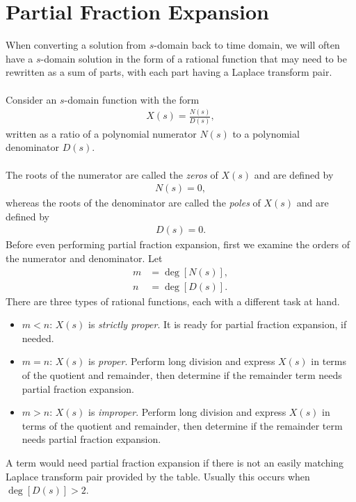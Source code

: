 \documentclass{report}
\begin{document}
\section{Partial Fraction Expansion}
When converting a solution from $s$-domain back to time domain, we will often have a $s$-domain solution in the form of a rational function that may need to be rewritten as a sum of parts, with 
each part having a Laplace transform pair.
\\ \\
Consider an $s$-domain function with the form
\begin{align}
    X(s) = \frac{N(s)}{D(s)},
\end{align}
written as a ratio of a polynomial numerator $N(s)$ to a polynomial denominator $D(s)$. 
\\ \\
The roots of the numerator are called the \emph{zeros} of $X(s)$ and are defined by 
\begin{align}
    N(s) = 0,
\end{align}
whereas the roots of the denominator are called the \emph{poles} of $X(s)$ and are defined by 
\begin{align}
    D(s) = 0.
\end{align}
Before even performing partial fraction expansion, first we examine the orders of the numerator and denominator. Let 
\begin{align}
    m &= \deg[N(s)], \\ 
    n &= \deg[D(s)].
\end{align}
There are three types of rational functions, each with a different task at hand.
\begin{itemize}
    \item $m < n$: $X(s)$ is \emph{strictly proper}. It is ready for partial fraction expansion, if needed.
    \item $m = n$: $X(s)$ is \emph{proper}. Perform long division and express $X(s)$ in terms of the quotient and remainder, then determine if the remainder term needs partial fraction expansion.
    \item $m > n$: $X(s)$ is \emph{improper}. Perform long division and express $X(s)$ in terms of the quotient and remainder, then determine if the remainder term needs partial fraction expansion.
\end{itemize}
A term would need partial fraction expansion if there is not an easily matching Laplace transform pair provided by the table. Usually this occurs when $\deg[D(s)]>2$.
\end{document}
